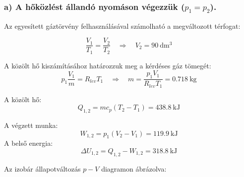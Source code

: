\noindent\hrulefill

\subsubsection{a) A hőközlést állandó nyomáson végezzük ($ p_1=p_2 $).}
\vspace{2mm}
\noindent Az egyesített gáztörvény felhasználásával számolható a megváltozott térfogat:

\begin{equation}
\dfrac{V_1}{T_1}=\dfrac{V_2}{T_2}
\quad 
\Rightarrow
\quad
V_2=\SI{90}{\deci\meter\cubed}
\end{equation}

\noindent A közölt hő kiszámításához határozzuk meg a kérdéses gáz tömegét:
\begin{equation}
p_1\dfrac{V_1}{m}=R_{lev}T_1
\quad
\Rightarrow
\quad
m=\dfrac{p_1 V_1}{R_{lev}T_1}=\SI{0,718}{\kilogram}
\end{equation}

\noindent A közölt hő:
\begin{equation}
Q_{1,2}=m c_p\left(T_2-T_1\right)=\SI{438,8}{\kilo\joule}
\end{equation}

\noindent A végzett munka:
\begin{equation}
W_{1,2}=p_1\left(V_2-V_1\right)=\SI{119,9}{\kilo\joule}
\end{equation}
\noindent A belső energia:
\begin{equation}
\Delta U_{1,2}= Q_{1,2}-W_{1,2}=\SI{318,8}{\kilo\joule}
\end{equation}

\noindent Az izobár állapotváltozás $p-V$ diagramon ábrázolva:



